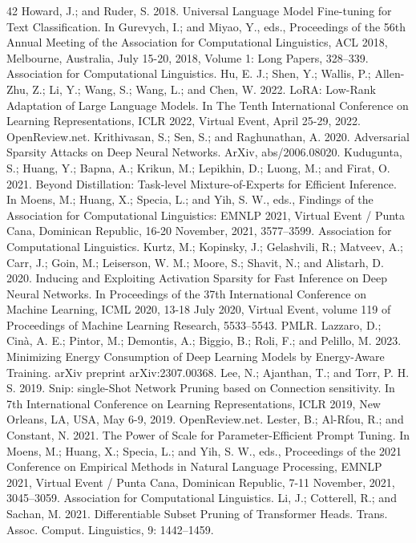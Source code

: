 \documentclass[conference]{IEEEtran}
\begin{document}
\begin{thebibliography}{42}
 Howard, J.; and Ruder, S. 2018. Universal Language Model Fine-tuning for Text Classification. In Gurevych, I.; and Miyao, Y., eds., Proceedings of the 56th Annual Meeting of the Association for Computational Linguistics, ACL 2018, Melbourne, Australia, July 15-20, 2018, Volume 1: Long Papers, 328–339. Association for Computational Linguistics.
 Hu, E. J.; Shen, Y.; Wallis, P.; Allen-Zhu, Z.; Li, Y.; Wang, S.; Wang, L.; and Chen, W. 2022. LoRA: Low-Rank Adaptation of Large Language Models. In The Tenth International Conference on Learning Representations, ICLR 2022, Virtual Event, April 25-29, 2022. OpenReview.net.
 Krithivasan, S.; Sen, S.; and Raghunathan, A. 2020. Adversarial Sparsity Attacks on Deep Neural Networks. ArXiv, abs/2006.08020.
 Kudugunta, S.; Huang, Y.; Bapna, A.; Krikun, M.; Lepikhin, D.; Luong, M.; and Firat, O. 2021. Beyond Distillation: Task-level Mixture-of-Experts for Efficient Inference. In Moens, M.; Huang, X.; Specia, L.; and Yih, S. W., eds., Findings of the Association for Computational Linguistics: EMNLP 2021, Virtual Event / Punta Cana, Dominican Republic, 16-20 November, 2021, 3577–3599. Association for Computational Linguistics.
 Kurtz, M.; Kopinsky, J.; Gelashvili, R.; Matveev, A.; Carr, J.; Goin, M.; Leiserson, W. M.; Moore, S.; Shavit, N.; and Alistarh, D. 2020. Inducing and Exploiting Activation Sparsity for Fast Inference on Deep Neural Networks. In Proceedings of the 37th International Conference on Machine Learning, ICML 2020, 13-18 July 2020, Virtual Event, volume 119 of Proceedings of Machine Learning Research, 5533–5543. PMLR.
 Lazzaro, D.; Cinà, A. E.; Pintor, M.; Demontis, A.; Biggio, B.; Roli, F.; and Pelillo, M. 2023. Minimizing Energy Consumption of Deep Learning Models by Energy-Aware Training. arXiv preprint arXiv:2307.00368.
 Lee, N.; Ajanthan, T.; and Torr, P. H. S. 2019. Snip: single-Shot Network Pruning based on Connection sensitivity. In 7th International Conference on Learning Representations, ICLR 2019, New Orleans, LA, USA, May 6-9, 2019. OpenReview.net.
 Lester, B.; Al-Rfou, R.; and Constant, N. 2021. The Power of Scale for Parameter-Efficient Prompt Tuning. In Moens, M.; Huang, X.; Specia, L.; and Yih, S. W., eds., Proceedings of the 2021 Conference on Empirical Methods in Natural Language Processing, EMNLP 2021, Virtual Event / Punta Cana, Dominican Republic, 7-11 November, 2021, 3045–3059. Association for Computational Linguistics.
 Li, J.; Cotterell, R.; and Sachan, M. 2021. Differentiable Subset Pruning of Transformer Heads. Trans. Assoc. Comput. Linguistics, 9: 1442–1459.

\end{thebibliography}
\end{document}
